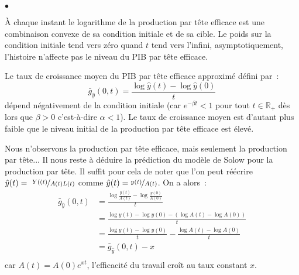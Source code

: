 \documentclass[10pt,notheorems]{beamer}
\theoremstyle{plain}
\theoremstyle{definition} %
\begin{document}
\begin{notes}

  \begin{list}{$\bullet$}{}

  \item À chaque instant le logarithme de la production par tête efficace est une combinaison convexe de sa condition initiale et de sa cible. Le poids sur la condition initiale tend vers zéro quand $t$ tend vers l'infini, asymptotiquement, l'histoire n'affecte pas le niveau du PIB par tête efficace.\newline

  \item Le taux de croissance moyen du PIB par tête efficace approximé défini par~:
    \[
      \bar g_{\hat y}(0,t) = \frac{\log\hat y(t)-\log\hat y(0)}{t}
    \]
    dépend négativement de la condition initiale (car $e^{-\beta t}<1$ pour tout $t\in\mathbb R_+$ dès lors que $\beta>0$ c'est-à-dire $\alpha<1$). Le taux de croissance moyen est d'autant plus faible que le niveau initial de la production par tête efficace est élevé.\newline

  \item Nous n'observons la production par tête efficace, mais seulement la production par tête... Il nous reste à déduire la prédiction du modèle de Solow pour la production par tête. Il suffit pour cela de noter que l'on peut réécrire $\hat y(t) = \nicefrac{Y((t)}{A(t)L(t)}$ comme $\hat y(t)=\nicefrac{y(t)}{A(t)}$. On a alors~:
    \[
      \begin{split}
        \bar g_{\hat y}(0,t) &= \frac{\log\frac{y(t)}{A(t)}-\log\frac{y(0)}{A(0)}}{t}\\
                             &= \frac{\log y(t)-\log y(0) - \left(\log A(t)-\log A(0)\right)}{t}\\
                             &= \frac{\log y(t)-\log y(0)}{t} - \frac{\log A(t)-\log A(0)}{t}\\
                             &= \bar g_{\hat y}(0,t) - x\\
      \end{split}
    \]
    car $A(t)=A(0)e^{xt}$, l'efficacité du travail croît au taux constant $x$.
  \end{list}

\end{notes}
\end{document}
